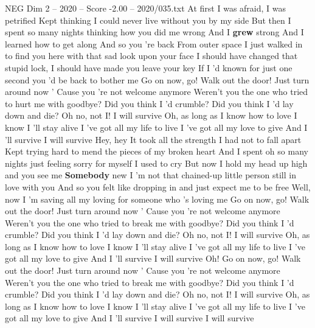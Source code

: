 \begin{textsample}{NEG Dim 2 – 2020 – Score -2.00 – 2020/035.txt}  \label{ex:f2_neg_025}
At first I was afraid, I was petrified Kept thinking I could never live without you by my side But then I spent so many nights thinking how you did me wrong And I \textbf{grew} strong And I learned how to get along And so you 're back From outer space I just walked in to find you here with that sad look upon your face I should have changed that stupid lock, I should have made you leave your key If I 'd known for just one second you 'd be back to bother me Go on now, go!
Walk out the door!
Just turn around now ' Cause you 're not welcome anymore Weren't you the one who tried to hurt me with goodbye?
Did you think I 'd crumble?
Did you think I 'd lay down and die?
Oh no, not I!
I will survive Oh, as long as I know how to love I know I 'll stay alive I 've got all my life to live I 've got all my love to give And I 'll survive I will survive Hey, hey It took all the strength I had not to fall apart Kept trying hard to mend the pieces of my broken heart And I spent oh so many nights just feeling sorry for myself I used to cry But now I hold my head up high and you see me \textbf{Somebody} new I 'm not that chained-up little person still in love with you And so you felt like dropping in and just expect me to be free Well, now I 'm saving all my loving for someone who 's loving me Go on now, go!
Walk out the door!
Just turn around now ' Cause you 're not welcome anymore Weren't you the one who tried to break me with goodbye?
Did you think I 'd crumble?
Did you think I 'd lay down and die?
Oh no, not I!
I will survive Oh, as long as I know how to love I know I 'll stay alive I 've got all my life to live I 've got all my love to give And I 'll survive I will survive Oh!
Go on now, go!
Walk out the door!
Just turn around now ' Cause you 're not welcome anymore Weren't you the one who tried to break me with goodbye?
Did you think I 'd crumble?
Did you think I 'd lay down and die?
Oh no, not I!
I will survive Oh, as long as I know how to love I know I 'll stay alive I 've got all my life to live I 've got all my love to give And I 'll survive I will survive I will survive

\end{textsample}
